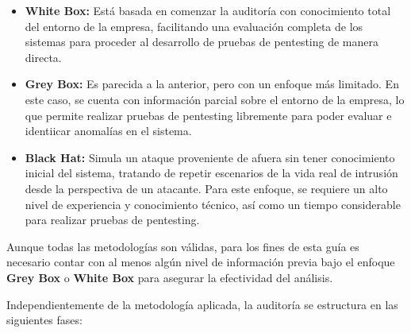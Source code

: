 \documentclass[a4paper, 10pt]{article}
\begin{document}
\begin{itemize}
\item \textbf{White Box:} Está basada en comenzar la auditoría con conocimiento total del entorno de la empresa, facilitando una evaluación 
completa de los sistemas para proceder al desarrollo de pruebas de pentesting de manera directa.
\item \textbf{Grey Box:} Es parecida a la anterior, pero con un enfoque más limitado. En este caso, se cuenta con información parcial sobre el entorno de la empresa, lo que permite realizar pruebas de pentesting libremente para poder evaluar e identiicar anomalías en el sistema.

\item \textbf{Black Hat:} Simula un ataque proveniente de afuera sin tener conocimiento inicial del sistema, tratando de repetir 
escenarios de la vida real de intrusión desde la perspectiva de un atacante. Para este enfoque, se requiere un alto nivel de experiencia y 
conocimiento técnico, así como un tiempo considerable para realizar pruebas de pentesting.
\end{itemize}

Aunque todas las metodologías son válidas, para los fines de esta guía es necesario contar con al menos algún nivel de información previa bajo el enfoque \textbf{Grey Box} o \textbf{White Box} para asegurar la efectividad del análisis.\par\vspace{0.5cm}

Independientemente de la metodología aplicada, la auditoría se estructura en las siguientes fases:
\end{document}

